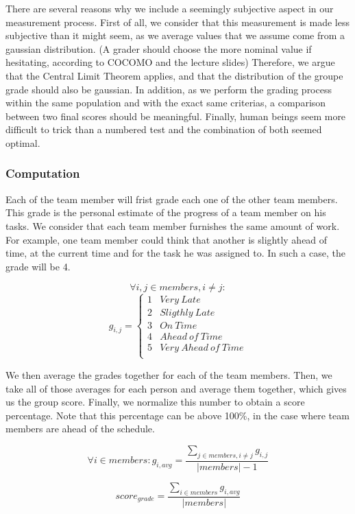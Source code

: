 \documentclass[]{article}
\begin{document}
There are several reasons why we include a seemingly subjective aspect in our measurement process. First of all, we consider that this measurement is made less subjective than it might seem, as we average values that we assume come from a gaussian distribution. (A grader should choose the more nominal value if hesitating, according to COCOMO and the lecture slides) Therefore, we argue that the Central Limit Theorem applies, and that the distribution of the groupe grade should also be gaussian. In addition, as we perform the grading process within the same population and with the exact same criterias, a comparison between two final scores should be meaningful. Finally, human beings seem more difficult to trick than a numbered test and the combination of both seemed optimal.

\subsubsection{Computation}\label{computation}
Each of the team member will frist grade each one of the other team members. This grade is the personal estimate of the progress of a team member on his tasks. We consider that each team member furnishes the same amount of work. For example, one team member could think that another is slightly ahead of time, at the current time and for the task he was assigned to. In such a case, the grade will be 4.

$$
\forall i, j \in members, i \not= j :
$$
$$
g_{i, j} =
\begin{cases}
1 &  Very\ Late \\
2 & Sligthly\ Late \\
3 & On\ Time \\
4 & Ahead\ of\ Time \\
5 & Very\ Ahead\ of\ Time \\
\end{cases}
$$

We then average the grades together for each of the team members. Then, we take all of those averages for each person and average them together, which gives us the group score. Finally, we normalize this number to obtain a score percentage. Note that this percentage can be above 100\%, in the case where team members are ahead of the schedule.

$$
\forall i \in members:
g_{i, avg} = \frac{\sum_{j \in members, i \not= j} g_{i, j}}{|members| -1}
$$

$$
score_{grade} = \frac{\sum_{i \in members} g_{i, avg}}{|members|}
$$
\end{document}
